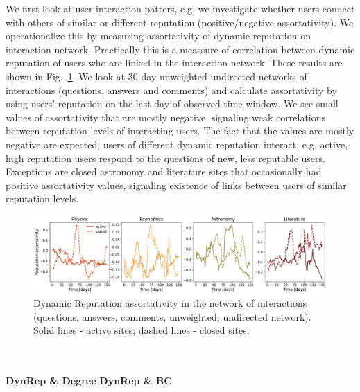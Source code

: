 We first look at user interaction patters, e.g. we investigate whether users connect with others of similar or different reputation (positive/negative assortativity). We operationalize this by measuring assortativity of dynamic reputation on interaction network. Practically this is a meassure of correlation between dynamic reputation of users who are linked in the interaction network. These results are shown in Fig.~\ref{fig:dyn_rep_assort}. We look at 30 day unweighted undirected networks of interactions (questions, answers and comments) and calculate assortativity by using users' reputation on the last day of observed time window. We see small values of assortativity that are mostly negative, signaling weak correlations between reputation levels of interacting users. The fact that the values are mostly negative are expected, users of different dynamic reputation interact, e.g. active, high reputation users respond to the questions of new, less reputable users. Exceptions are closed astronomy and literature sites that occasionally had positive assortativity values, signaling existence of links between users of similar reputation levels.
\begin{figure}[h!]
	\centering
	\includegraphics[width=1\linewidth]{figures/stackexchange/reputation_assortativity.pdf}
	\caption{Dynamic Reputation assortativity in the network of interactions (questions, answers, comments, unweighted, undirected network). Solid lines - active sites; dashed lines - closed sites.}
	\label{fig:dyn_rep_assort}
\end{figure}
\\~\\
\textbf{DynRep \& Degree}
\textbf{DynRep \& BC}

